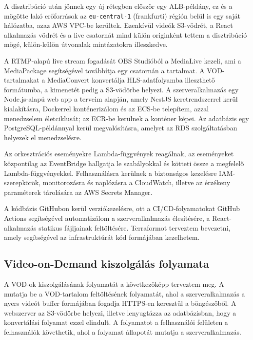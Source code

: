A disztribúció után jönnek egy új rétegben először egy ALB-példány, ez és a mögötte lakó erőforrások az \verb|eu-central-1| (frankfurti) régión belül is egy saját hálózatba, azaz AWS VPC-be kerültek. Ezenkívül videók S3-vödrét, a React alkalmazás vödrét és a live csatornát mind külön originként tettem a disztribúció mögé, külön-külön útvonalak mintázatokra illeszkedve.

A RTMP-alapú live stream fogadását OBS Studióból a MediaLive kezeli, ami a MediaPackage segítségével továbbítja egy csatornán a tartalmat. A VOD-tartalmakat a MediaConvert konvertálja HLS-adatfolyamba illeszthető formátumba, a kimenetét pedig a S3-vödörbe helyezi. A szerveralkalmazás egy Node.js-alapú web app a terveim alapján, amely NestJS keretrendszerrel kerül kialakításra, Dockerrel konténerizálom és az ECS-be telepítem, azzal menedzselem életciklusát; az ECR-be kerülnek a konténer képei. Az adatbázis egy PostgreSQL-példánnyal kerül megvalósításra, amelyet az RDS szolgáltatásban helyezek el menedzselésre.

Az orkesztrációs eseményekre Lambda-függvények reagálnak, az eseményeket központilag az EventBridge hallgatja le szabályokkal és kötteti össze a megfelelő Lambda-függvényekkel. Felhasználásra kerülnek a biztonságos kezelésre IAM-szerepkörök, monitorozásra és naplózásra a CloudWatch, illetve az érzékeny paraméterek tárolására az AWS Secrets Manager.

A kódbázis GitHubon kerül verziókezelésre, ott a CI/CD-folyamatokat GitHub Actions segítségével automatizálom a szerveralkalmazás élesítésére, a React-alkalmazás statikus fájljainak feltöltésére. Terraformot terveztem bevezetni, amely segítségével az infrastruktúrát kód formájában kezelhetem.

\subsection{Video-on-Demand kiszolgálás folyamata}

A VOD-ok kiszolgálásának folyamatát a következőképp terveztem meg. A  mutatja be a VOD-tartalom feltöltésének folyamatát, ahol a szerveralkalmazás a nyers videót buffer formájában fogadja HTTPS-en keresztül a böngészőből. A webszerver az S3-vödörbe helyezi, illetve lenyugtázza az adatbázisban, hogy a konvertálási folyamat ezzel elindult. A folyamatot a felhasználói felületen a felhasználók követhetik, ahol a folyamat állapotát mutatja a szerveralkalmazás.

